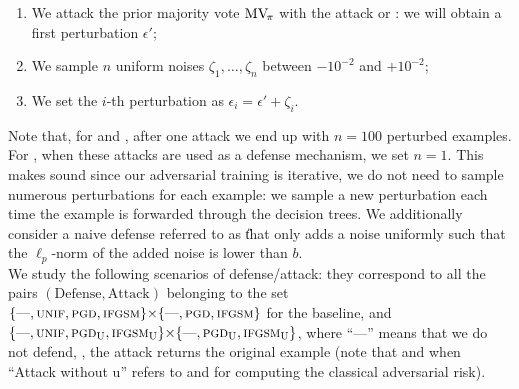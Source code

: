 \begin{enumerate}[label=(\roman*)]
    \item We attack the prior majority vote $\text{MV}_{\!\pi}$ with the  attack \PGD or \IFGSM: we will obtain a first perturbation $\epsilon'$;
    \item We sample $n$ uniform noises $\zeta_1, \dots, \zeta_{n}$ between $-10^{-2}$ and $+10^{-2}$;
    \item We set the $i$-th perturbation as $\epsilon_i=\epsilon'+\zeta_i$.
\end{enumerate}
Note that, for \PGDU and \IFGSMU, after one attack we end up with $n{=}100$ perturbed examples.
For , when these attacks are used as a defense mechanism, we set $n{=}1$. 
This makes sound since our adversarial training is iterative, we do not need to sample numerous perturbations for each example: we sample a new perturbation each time the example is forwarded through the decision trees.
We additionally consider a naive defense referred to as \U that only adds a noise uniformly such that the $\ell_p$-norm of the added noise is lower than $b$.\\
We study the following scenarios of defense/attack: they correspond to all the pairs $(\text{Defense}, \text{Attack})$ belonging to the set $\{\text{---},\text{{\sc unif}}, \text{{\sc pgd}}, \text{{\sc ifgsm}} \}{\times}\{\text{---}, \text{{\sc pgd}}, \text{{\sc ifgsm}}\}$ for the baseline, and $\{\text{---},\text{{\sc unif}}, \text{{\sc pgd}$_{\text{U}}$}, \text{{\sc ifgsm}$_{\text{U}}$} \}{\times}\{\text{---}, \text{{\sc pgd}$_{\text{U}}$}, \text{{\sc ifgsm}$_{\text{U}}$}\}$, where ``---'' means that we do not defend, \ie, the attack returns the original example (note that \PGDU and \IFGSMU when ``Attack without {\sc u}'' refers to \PGD and \IFGSM for computing the classical adversarial risk).\\

